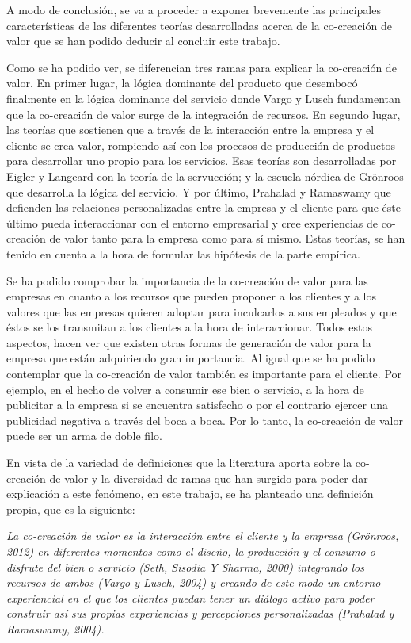 A modo de conclusión, se va a proceder a exponer brevemente las principales características de las diferentes teorías desarrolladas acerca de la co-creación de valor que se han podido deducir al concluir este trabajo.

Como se ha podido ver, se diferencian tres ramas para explicar la co-creación de valor. En primer lugar, la lógica dominante del producto que desembocó finalmente en la lógica dominante del servicio donde Vargo y Lusch fundamentan que la co-creación de valor surge de la integración de recursos. En segundo lugar, las teorías que sostienen que a través de la interacción entre la empresa y el cliente se crea valor, rompiendo así con los procesos de producción de productos para desarrollar uno propio para los servicios. Esas teorías son desarrolladas por Eigler y Langeard con la teoría de la servucción; y la escuela nórdica de Grönroos que desarrolla la lógica del servicio. Y por último, Prahalad y Ramaswamy que defienden las relaciones personalizadas entre la empresa y el cliente para que éste último pueda interaccionar con el entorno empresarial y cree experiencias de co-creación de valor tanto para la empresa como para sí mismo. Estas teorías, se han tenido en cuenta a la hora de formular las hipótesis de la parte empírica.

Se ha podido comprobar la importancia de la co-creación de valor para las empresas en cuanto a los recursos que pueden proponer a los clientes y a los valores que las empresas quieren adoptar para inculcarlos a sus empleados y que éstos se los transmitan a los clientes a la hora de interaccionar. Todos estos aspectos, hacen ver que existen otras formas de generación de valor para la empresa que están adquiriendo gran importancia. Al igual que se ha podido contemplar que la co-creación de valor también es importante para el cliente. Por ejemplo, en el hecho de volver a consumir ese bien o servicio, a la hora de publicitar a la empresa si se encuentra satisfecho o por el contrario ejercer una publicidad negativa a través del boca a boca. Por lo tanto, la co-creación de valor puede ser un arma de doble filo.

En vista de la variedad de definiciones que la literatura aporta sobre la co-creación de valor y la diversidad de ramas que han surgido para poder dar explicación a este fenómeno, en este trabajo, se ha planteado una definición propia, que es la siguiente:

\emph{La co-creación de valor es la interacción entre el cliente y la empresa (Grönroos, 2012) en diferentes momentos como el diseño, la producción y el consumo o disfrute del bien o servicio (Seth, Sisodia Y Sharma, 2000) integrando los recursos de ambos (Vargo y Lusch, 2004) y creando de este modo un entorno experiencial en el que los clientes puedan tener un diálogo activo para poder construir así sus propias experiencias y percepciones personalizadas (Prahalad y Ramaswamy, 2004).}

